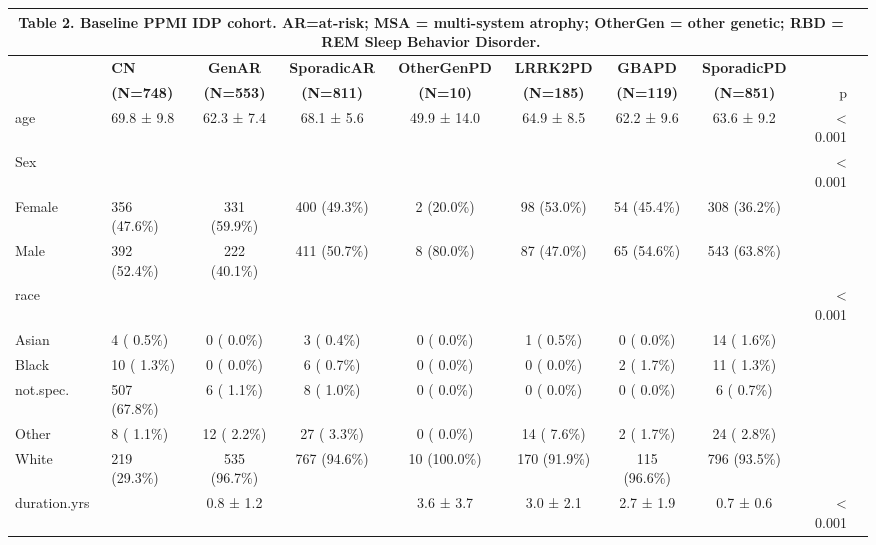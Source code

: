 \documentclass[
  table]{article}
\begin{document}
\begin{table}
\begin{center}
\begin{small}
\color{black}
\begin{tabular}{llccccccrr}
\multicolumn{9}{c}{Table 2. Baseline PPMI IDP cohort. AR=at-risk; MSA = multi-system atrophy; OtherGen = other genetic; RBD = REM Sleep Behavior Disorder.}\\ 
\hline
\textbf{}&\textbf{CN}&\textbf{GenAR}&\textbf{SporadicAR}&\textbf{OtherGenPD}&\textbf{LRRK2PD}&\textbf{GBAPD}&\textbf{SporadicPD}&\\ 
\textbf{}&\textbf{(N=748)}&\textbf{(N=553)}&\textbf{(N=811)}&\textbf{(N=10)}&\textbf{(N=185)}&\textbf{(N=119)}&\textbf{(N=851)}&\multirow{-2}{*}{p}\\ 
\hline
age                &69.8 ±  9.8&62.3 ±  7.4&68.1 ±  5.6&49.9 ± 14.0&64.9 ±  8.5&62.2 ±  9.6&63.6 ±  9.2&< 0.001\\ 
Sex                &&&&&&&&< 0.001\\ 
 \hspace{0.5cm} Female         &356 (47.6\%)&331 (59.9\%)&400 (49.3\%)&2 (20.0\%)&98 (53.0\%)&54 (45.4\%)&308 (36.2\%)&\\ 
 \hspace{0.5cm} Male           &392 (52.4\%)&222 (40.1\%)&411 (50.7\%)&8 (80.0\%)&87 (47.0\%)&65 (54.6\%)&543 (63.8\%)&\\ 
race               &&&&&&&&< 0.001\\ 
 \hspace{0.5cm} Asian          &4 ( 0.5\%)& 0 ( 0.0\%)&3 ( 0.4\%)& 0 ( 0.0\%)&1 ( 0.5\%)& 0 ( 0.0\%)&14 ( 1.6\%)&\\ 
 \hspace{0.5cm} Black          &10 ( 1.3\%)& 0 ( 0.0\%)&6 ( 0.7\%)& 0 ( 0.0\%)& 0 ( 0.0\%)&2 ( 1.7\%)&11 ( 1.3\%)&\\ 
 \hspace{0.5cm} not.spec.      &507 (67.8\%)&6 ( 1.1\%)&8 ( 1.0\%)& 0 ( 0.0\%)& 0 ( 0.0\%)& 0 ( 0.0\%)&6 ( 0.7\%)&\\ 
 \hspace{0.5cm} Other          &8 ( 1.1\%)&12 ( 2.2\%)&27 ( 3.3\%)& 0 ( 0.0\%)&14 ( 7.6\%)&2 ( 1.7\%)&24 ( 2.8\%)&\\ 
 \hspace{0.5cm} White          &219 (29.3\%)&535 (96.7\%)&767 (94.6\%)&10 (100.0\%)&170 (91.9\%)&115 (96.6\%)&796 (93.5\%)&\\ 
duration.yrs       &   \hspace{0.5cm}& 0.8 ±  1.2&   \hspace{0.5cm}& 3.6 ±  3.7& 3.0 ±  2.1& 2.7 ±  1.9& 0.7 ±  0.6&< 0.001\\ 

\end{tabular}
\end{small}
\end{center}
\end{table}
\end{document}
